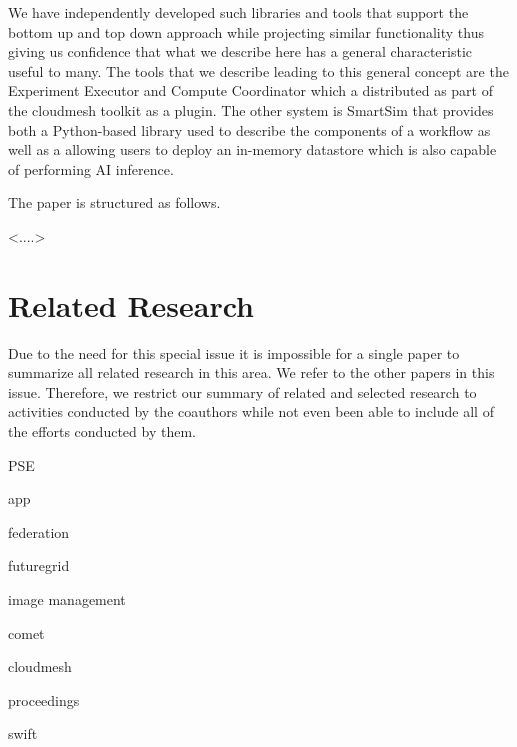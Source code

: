 \documentclass[utf8]{FrontiersinVancouver} %
\begin{document}
We have independently developed such libraries and tools that support the bottom up and top down approach while projecting similar functionality thus giving us confidence that what we describe here has a general characteristic useful to many.
The tools that we describe leading to this general concept are the Experiment Executor and Compute Coordinator which a distributed as part of the cloudmesh toolkit as a plugin. The other system is SmartSim that provides both a Python-based library used to describe the components of a workflow as well as a allowing users to deploy an in-memory datastore which is also capable of performing AI inference. 

The paper is structured as follows.

<....> 


\section{Related Research}

Due to the need for this special issue it is impossible for a single paper to summarize all related research in this area. We refer to the other papers in this issue. Therefore, we restrict our summary of related and selected research to activities conducted by the coauthors while not even been able to include all of the efforts conducted by them.



PSE
\citep{las-01-pse}

app
\citep{las-00-sbc}


federation \citep{las-08-federated-cloud}

futuregrid \citep{las-20-10gce} \citep{las-14-bigdata} \citep{las-12-fg-bookchapter}
\citep{las-17-futuregrid}

image management
\citep{las-12-imagemanagement}

comet \citep{las-16-virtcluster}
\citep{las-19-harc-comet}

cloudmesh
\citep{las-17-cloudmesh}

proceedings
\citep{las-12-fg-1471}

swift 
\citep{las--7-swift}
\end{document}
